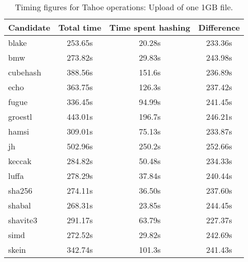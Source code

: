 \begin{table}[h]
  \centering
  \begin{tabular}{ | l | c | c | c | }
    \hline
    Candidate & Total time & Time spent hashing & Difference \\ \hline
    blake & 253.65s & 20.28s & 233.36s \\ \hline
    bmw & 273.82s & 29.83s & 243.98s \\ \hline
    cubehash & 388.56s & 151.6s & 236.89s \\ \hline
    echo & 363.75s & 126.3s & 237.42s \\ \hline
    fugue & 336.45s & 94.99s & 241.45s \\ \hline
    groestl & 443.01s & 196.7s & 246.21s \\ \hline
    hamsi & 309.01s & 75.13s & 233.87s \\ \hline
    jh & 502.96s & 250.2s & 252.66s \\ \hline
    keccak & 284.82s & 50.48s & 234.33s \\ \hline
    luffa & 278.29s & 37.84s & 240.44s \\ \hline
    sha256 & 274.11s & 36.50s & 237.60s \\ \hline
    shabal & 268.31s & 23.85s & 244.45s \\ \hline
    shavite3 & 291.17s & 63.79s & 227.37s \\ \hline
    simd & 272.52s & 29.82s & 242.69s \\ \hline
    skein & 342.74s & 101.3s & 241.43s \\ \hline
  \end{tabular}
  \caption{Timing figures for Tahoe operations: Upload of one 1GB file.}
  \label{tbl:hashingtimes:put1gb}
\end{table}

